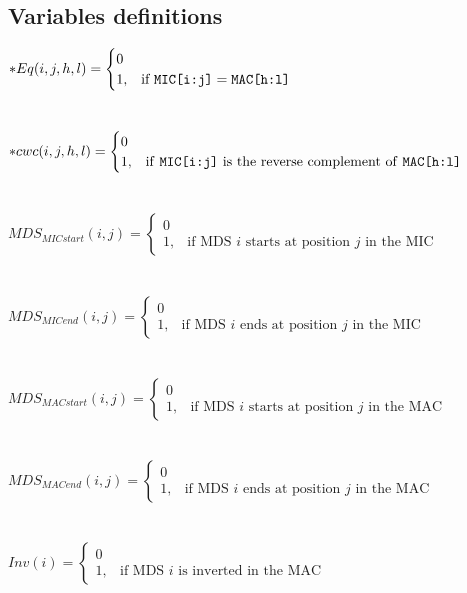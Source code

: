 \subsection{Variables definitions}

$*Eq(i,j,h,l) = \begin{cases} 0 \\ 1, & \mbox{if } \texttt{MIC[i:j]} = \texttt{MAC[h:l]} \end{cases}$ \\\\\\
$*cwc(i,j,h,l) = \begin{cases} 0 \\ 1, & \mbox{if \texttt{MIC[i:j]} is the reverse complement of \texttt{MAC[h:l]}} \end{cases}$ \\\\\\
$MDS_{MICstart}(i,j) = \begin{cases} 0 \\ 1, & \mbox{if MDS } i\mbox{ starts at position } j \mbox{ in the MIC} \end{cases}$ \\\\\\
$MDS_{MICend}(i,j) = \begin{cases} 0 \\ 1, & \mbox{if MDS } i\mbox{ ends at position } j \mbox{ in the MIC} \end{cases}$ \\\\\\
$MDS_{MACstart}(i,j) = \begin{cases} 0 \\ 1, & \mbox{if MDS } i\mbox{ starts at position } j \mbox{ in the MAC} \end{cases}$ \\\\\\
$MDS_{MACend}(i,j) = \begin{cases} 0 \\ 1, & \mbox{if MDS } i\mbox{ ends at position } j \mbox{ in the MAC} \end{cases}$ \\\\\\
$Inv(i) = \begin{cases} 0 \\ 1, & \mbox{if MDS } i\mbox{ is inverted in the MAC } \end{cases}$ \\\\\\
